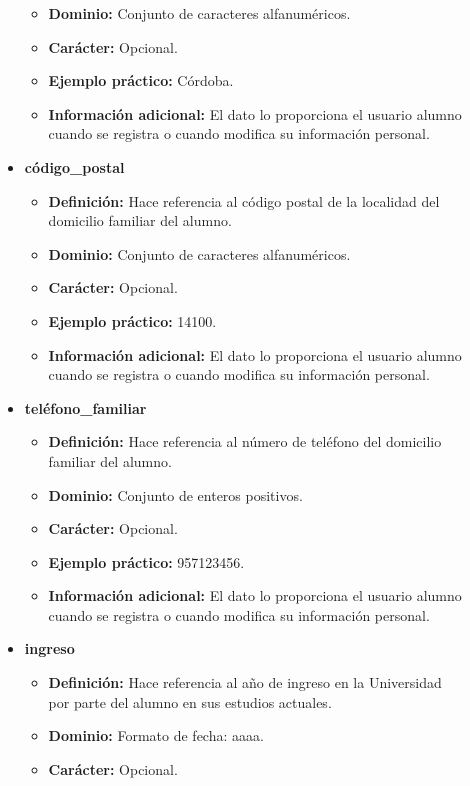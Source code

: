 \begin{description}
\begin{itemize}
\begin{itemize}
         \item \textbf{Dominio:} Conjunto de caracteres alfanuméricos.
         \item \textbf{Carácter:}  Opcional.
         \item \textbf{Ejemplo práctico:} Córdoba.
         \item \textbf{Información adicional:} El dato lo proporciona el usuario alumno cuando se registra o cuando modifica su información personal.
      \end{itemize}
   \item \textbf{código\_postal}
      \begin{itemize}
         \item \textbf{Definición:} Hace referencia al código postal de la localidad del domicilio familiar del alumno.
         \item \textbf{Dominio:} Conjunto de caracteres alfanuméricos.
         \item \textbf{Carácter:}  Opcional.
         \item \textbf{Ejemplo práctico:} 14100.
         \item \textbf{Información adicional:} El dato lo proporciona el usuario alumno cuando se registra o cuando modifica su información personal.
      \end{itemize}
   \item \textbf{teléfono\_familiar}
      \begin{itemize}
         \item \textbf{Definición:} Hace referencia al número de teléfono del domicilio familiar del alumno.
         \item \textbf{Dominio:} Conjunto de enteros positivos.
         \item \textbf{Carácter:}  Opcional.
         \item \textbf{Ejemplo práctico:} 957123456.
         \item \textbf{Información adicional:} El dato lo proporciona el usuario alumno cuando se registra o cuando modifica su información personal.
      \end{itemize}
   \item \textbf{ingreso}
      \begin{itemize}
         \item \textbf{Definición:} Hace referencia al año de ingreso en la Universidad por parte del alumno en sus estudios actuales.
         \item \textbf{Dominio:} Formato de fecha: aaaa.
         \item \textbf{Carácter:}  Opcional.

\end{itemize}
\end{itemize}
\end{description}
